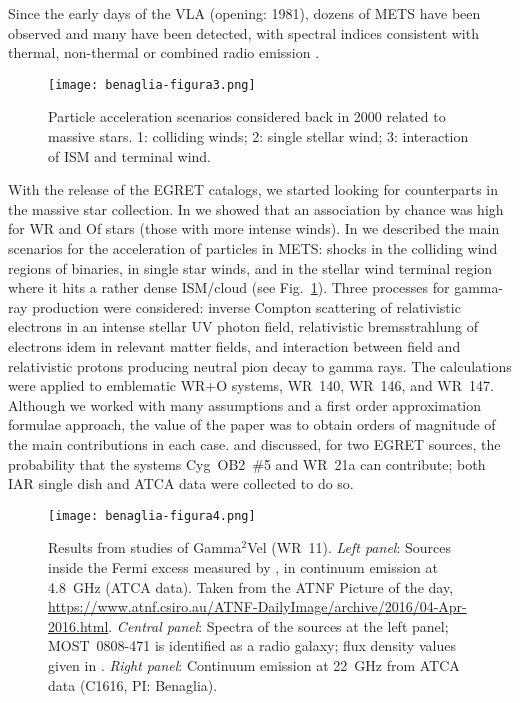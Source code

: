 \documentclass[baaa]{baaa}
\begin{document}
Since the early days of the VLA (opening: 1981), dozens of METS have been observed and many have been detected, with spectral indices consistent with thermal, non-thermal or combined radio emission \citep[][etc]{bieging1989,scuderi1998,benaglia2006,benaglia2007}. 

\begin{figure}[!t]
\centering
\texttt{[image: benaglia-figura3.png]}
\caption{Particle acceleration scenarios considered back in 2000 related to massive stars. 1: colliding winds; 2: single stellar wind; 3: interaction of ISM and terminal wind.}
\label{fig:scenarios}
\end{figure}

With the release of the EGRET catalogs, we started looking for counterparts in the massive star collection. In \citet{romero1999} we showed that an  association by chance was high for WR and Of stars (those with more intense winds). In \citet{benagliarom2003} we described the main scenarios for the acceleration of particles in METS: shocks in the colliding wind regions of binaries, in single star winds, and in the stellar wind terminal region where it hits a rather dense ISM/cloud (see Fig.~\ref{fig:scenarios}). Three processes for gamma-ray production were considered: inverse Compton scattering of relativistic electrons in an intense stellar UV photon field, relativistic bremsstrahlung of electrons idem in relevant matter fields, and interaction between field and relativistic protons producing neutral pion decay to gamma rays. The calculations were applied to emblematic WR+O systems, WR~140, WR~146, and WR~147. Although we worked with many assumptions and a first order approximation formulae approach, the value of the paper was to obtain orders of magnitude of the main contributions in each case.  
\citet{benagliacyg2001} and \citet{benaglia2005} discussed, for two EGRET sources, the probability that the systems Cyg~OB2~\#5 and WR~21a can contribute; both IAR single dish and ATCA data were collected to do so.

\begin{figure*}[!t]
\centering
\texttt{[image: benaglia-figura4.png]}
\caption{Results from studies of Gamma$^2$Vel (WR~11). \emph{Left panel}: Sources inside the Fermi excess measured by \citet{pshirkov2016}, in continuum emission at 4.8~GHz (ATCA data). Taken from the ATNF Picture of the day, \url{https://www.atnf.csiro.au/ATNF-DailyImage/archive/2016/04-Apr-2016.html}.  \emph{Central panel}: Spectra of the sources at the left panel; MOST~0808-471 is identified as a radio galaxy; flux density values given in \citet{benaglia2019}. \emph{Right panel}: Continuum emission at 22~GHz from ATCA data (C1616, PI: Benaglia).}
\label{fig:wr11}
\end{figure*}
\end{document}
